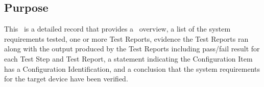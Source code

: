 \subsection{Purpose}
This \stdRptPkg\ is a detailed record that provides a \stdTestRecord\ overview,
a list of the system requirements tested, one or more Test Reports, evidence
the Test Reports ran along with the output produced by the Test Reports
including pass/fail result for each Test Step and Test Report, a statement
indicating the Configuration Item has a Configuration Identification, and
a conclusion that the system requirements for the target device have been
verified.
